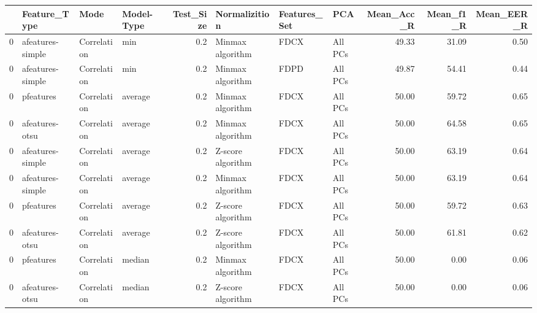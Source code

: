 \begin{tabular}{llllrlllrrr}
\toprule
{} &      Feature\_Type &         Mode & Model-Type &  Test\_Size &      Normalizition & Features\_Set &      PCA &  Mean\_Acc\_R &  Mean\_f1\_R &  Mean\_EER\_R \\
\midrule
0 &  afeatures-simple &  Correlation &        min &        0.2 &   Minmax algorithm &         FDCX &  All PCs &       49.33 &      31.09 &        0.50 \\
0 &  afeatures-simple &  Correlation &        min &        0.2 &   Minmax algorithm &         FDPD &  All PCs &       49.87 &      54.41 &        0.44 \\
0 &         pfeatures &  Correlation &    average &        0.2 &   Minmax algorithm &         FDCX &  All PCs &       50.00 &      59.72 &        0.65 \\
0 &    afeatures-otsu &  Correlation &    average &        0.2 &   Minmax algorithm &         FDCX &  All PCs &       50.00 &      64.58 &        0.65 \\
0 &  afeatures-simple &  Correlation &    average &        0.2 &  Z-score algorithm &         FDCX &  All PCs &       50.00 &      63.19 &        0.64 \\
0 &  afeatures-simple &  Correlation &    average &        0.2 &   Minmax algorithm &         FDCX &  All PCs &       50.00 &      63.19 &        0.64 \\
0 &         pfeatures &  Correlation &    average &        0.2 &  Z-score algorithm &         FDCX &  All PCs &       50.00 &      59.72 &        0.63 \\
0 &    afeatures-otsu &  Correlation &    average &        0.2 &  Z-score algorithm &         FDCX &  All PCs &       50.00 &      61.81 &        0.62 \\
0 &         pfeatures &  Correlation &     median &        0.2 &   Minmax algorithm &         FDCX &  All PCs &       50.00 &       0.00 &        0.06 \\
0 &    afeatures-otsu &  Correlation &     median &        0.2 &  Z-score algorithm &         FDCX &  All PCs &       50.00 &       0.00 &        0.06 \\
\bottomrule
\end{tabular}
